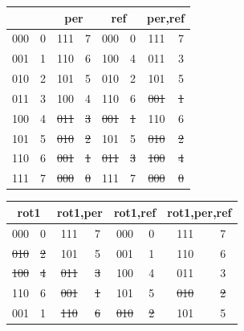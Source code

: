 \documentclass{ijuc}
\begin{document}
\begin{table}
\begin{center}
\begin{tabular}{cc|cc|cc|cc}
\multicolumn{2}{c|}{} & \multicolumn{2}{c|}{per} & \multicolumn{2}{c|}{ref} & \multicolumn{2}{c}{per,ref} \\ \hline
000 & 0               &       111  &       7     &       000  &       0     &       111  &       7        \\
001 & 1               &       110  &       6     &       100  &       4     &       011  &       3        \\
010 & 2               &       101  &       5     &       010  &       2     &       101  &       5        \\
011 & 3               &       100  &       4     &       110  &       6     & \sout{001} & \sout{1}       \\
100 & 4               & \sout{011} & \sout{3}    & \sout{001} & \sout{1}    &       110  &       6        \\
101 & 5               & \sout{010} & \sout{2}    &       101  &       5     & \sout{010} & \sout{2}       \\
110 & 6               & \sout{001} & \sout{1}    & \sout{011} & \sout{3}    & \sout{100} & \sout{4}       \\
111 & 7               & \sout{000} & \sout{0}    &       111  &       7     & \sout{000} & \sout{0}       \\
\end{tabular}
\begin{tabular}{cc|cc|cc|cc}
\multicolumn{2}{c|}{rot1} & \multicolumn{2}{c|}{rot1,per} & \multicolumn{2}{c|}{rot1,ref} & \multicolumn{2}{c}{rot1,per,ref} \\ \hline
      000  &       0      &       111  &       7          &       000  &       0          &       111  &       7             \\
\sout{010} & \sout{2}     &       101  &       5          &       001  &       1          &       110  &       6             \\
\sout{100} & \sout{4}     & \sout{011} & \sout{3}         &       100  &       4          &       011  &       3             \\
      110  &       6      & \sout{001} & \sout{1}         &       101  &       5          & \sout{010} & \sout{2}            \\
      001  &       1      & \sout{110} & \sout{6}         & \sout{010} & \sout{2}         &       101  &       5             \\

\end{tabular}
\end{center}
\end{table}
\end{document}
